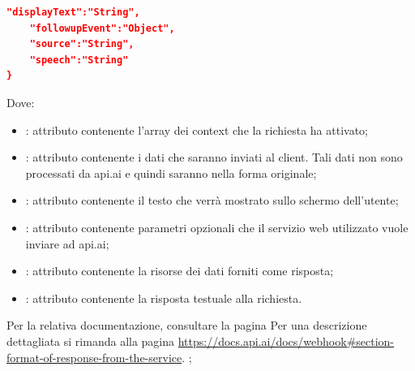 \begin{itemize}
\begin{itemize}
\begin{itemize}
\begin{lstlisting}[language=json,firstnumber=1]
    "displayText":"String",
    "followupEvent":"Object",
    "source":"String",
    "speech":"String"
}
\end{lstlisting}
Dove:
\begin{itemize}
    \item {}: attributo contenente l'array dei context che la richiesta ha attivato;
    \item {}: attributo contenente i dati che saranno inviati al client. Tali dati non sono processati da api.ai e quindi saranno nella forma originale;
    \item {}: attributo contenente il testo che verrà mostrato sullo schermo dell'utente;
    \item {}: attributo contenente parametri opzionali che il servizio web utilizzato vuole inviare ad api.ai;
    \item {}: attributo contenente la risorse dei dati forniti come risposta;
    \item {}: attributo contenente la risposta testuale alla richiesta.
\end{itemize}

Per la relativa documentazione, consultare la pagina Per una descrizione dettagliata si rimanda alla pagina \url{https://docs.api.ai/docs/webhook#section-format-of-response-from-the-service}.
;
		\end{itemize}
	\end{itemize}
\end{itemize}

